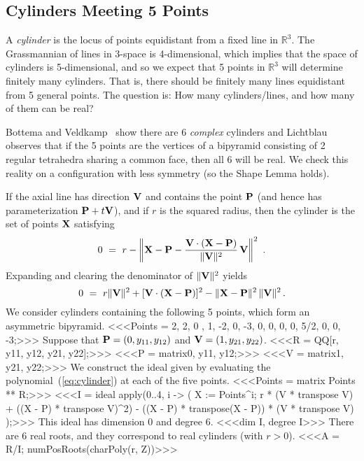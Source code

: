 \subsection{Cylinders Meeting 5 Points}\label{sec:cylinder}
A {\it cylinder} is the locus of points equidistant from a
fixed line in ${\mathbb R}^3$. 
The Grassmannian of lines in 3-space is 4-dimensional,
which implies that 
the space of cylinders is 5-dimensional, and so we expect that 5 points in  
${\mathbb R}^3$ will determine finitely many cylinders.
That is, there should be finitely many lines equidistant from 5 general points.
The question is: How many cylinders/lines, and how many of them can be real?

Bottema and Veldkamp~\cite{SO:BV77}
show there are 6 {\it complex} cylinders 
and Lichtblau~\cite{SO:Li00} observes that if the 5
points are the vertices of 
a bipyramid consisting of 2 regular tetrahedra sharing a common face, then
all 6 will be real.
We check this reality on a configuration with less symmetry (so the Shape
Lemma holds).

If the axial line has direction ${\bf V}$ and contains the point ${\bf P}$
(and hence has parameterization ${\bf P}+t{\bf V}$), and if $r$ is the squared
radius, then the cylinder is the set of points ${\bf X}$
satisfying 
$$
  0 \ =\ r - 
  \left\| {\bf X} - {\bf P} - \frac{{\bf V}\cdot({\bf X} - {\bf P})}%
     {\|{\bf V}\|^2}\,{\bf V} \right\|^2\ .
$$
Expanding and clearing the denominator of $\|{\bf V}\|^2$ yields
%
\begin{equation}\label{eq:cylinder}
  0 \ =\ r \|{\bf V}\|^2 + 
         [{\bf V}\cdot({\bf X} - {\bf P})]^2 - 
        \|{\bf X} - {\bf P}\|^2\, \|{\bf V}\|^2\,.
\end{equation}
%
We consider cylinders containing the following 5 points, which form an
asymmetric bipyramid.
%
<<<Points = {{2, 2,  0 }, {1, -2,  0}, {-3, 0, 0}, 
          {0, 0, 5/2}, {0,  0, -3}};>>>
%
Suppose that ${\bf P}=(0,y_{11},y_{12})$ and ${\bf V}=(1,y_{21},y_{22})$.
%
<<<R = QQ[r, y11, y12, y21, y22];>>>
%
<<<P = matrix{{0, y11, y12}};>>>
%
<<<V = matrix{{1, y21, y22}};>>>
%
We construct the ideal given by evaluating the
polynomial~(\ref{eq:cylinder}) at each of the five points.
%
<<<Points = matrix Points ** R;>>>
%
%
<<<I = ideal apply(0..4, i -> (
          X := Points^{i};
          r * (V * transpose V)  +
           ((X - P) * transpose V)^2) -
           ((X - P) * transpose(X - P)) * (V * transpose V)
          );>>>
%
This ideal has dimension 0 and degree 6.
%
<<<dim I, degree I>>>
%
There are 6 real roots, and they correspond to real cylinders (with $r>0$).
%
<<<A = R/I; numPosRoots(charPoly(r, Z))>>>
%

